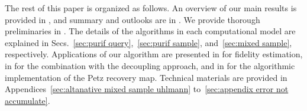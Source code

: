 The rest of this paper is organized as follows. An overview of our main results is provided in , and summary and outlooks are in . 
We provide thorough preliminaries in .
The details of the algorithms in each computational model are explained in Secs.~\ref{sec:purif query},~\ref{sec:purif sample}, and~\ref{sec:mixed sample}, respectively.
Applications of our algorithm are presented in  for fidelity estimation, in  for the combination with the decoupling approach, and in  for the algorithmic implementation of the Petz recovery map.
Technical materials are provided in Appendices~\ref{sec:altanative mixed sample uhlmann} to~\ref{sec:appendix error not accumulate}. 









